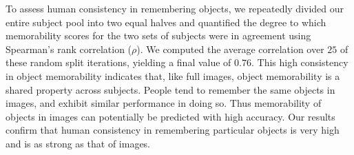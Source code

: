 To assess human consistency in remembering objects, we repeatedly divided our entire subject pool into two equal halves and quantified the degree to which memorability scores for the two sets of subjects were in agreement using Spearman’s rank correlation ($\rho$). We computed the average correlation over $25$ of these random split iterations, yielding a final value of $0.76$. This high consistency in object memorability indicates that, like full images, object memorability is a shared property across subjects. People tend to remember the same objects in images, and exhibit similar performance in doing so. Thus memorability of objects in images can potentially be predicted with high accuracy. Our results confirm that human consistency in remembering particular objects is very high and is as strong as that of images.

